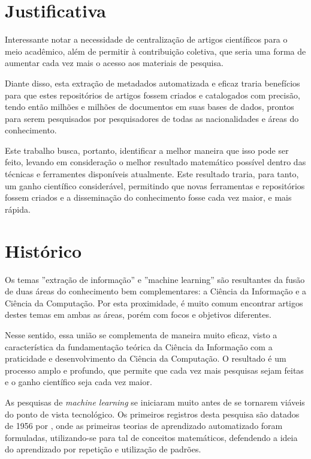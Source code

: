 \section{Justificativa}
\label{sec:justification}

Interessante notar a necessidade de centralização de artigos científicos para o meio acadêmico, além de permitir à contribuição coletiva, que seria uma forma de aumentar cada vez mais o acesso aos materiais de pesquisa. 

Diante disso, esta extração de metadados automatizada e eficaz traria benefícios para que estes repositórios de artigos fossem criados e catalogados com precisão, tendo então milhões e milhões de documentos em suas bases de dados, prontos para serem pesquisados por pesquisadores de todas as nacionalidades e áreas do conhecimento.

Este trabalho busca, portanto, identificar a melhor maneira que isso pode ser feito, levando em consideração o melhor resultado matemático possível dentro das técnicas e ferramentes disponíveis atualmente. Este resultado traria, para tanto, um ganho científico considerável, permitindo que novas ferramentas e repositórios fossem criados e a disseminação do conhecimento fosse cada vez maior, e mais rápida.

\section{Histórico}
\label{sec:history}

Os temas ''extração de informação'' e ''machine learning'' são resultantes da fusão de duas áreas do conhecimento bem complementares: a Ciência da Informação e a Ciência da Computação. Por esta proximidade, é muito comum encontrar artigos destes temas em ambas as áreas, porém com focos e objetivos diferentes.

Nesse sentido, essa união se complementa de maneira muito eficaz, visto a característica da fundamentação teórica da Ciência da Informação com a praticidade e desenvolvimento da Ciência da Computação. O resultado é um processo amplo e profundo, que permite que cada vez mais pesquisas sejam feitas e o ganho científico seja cada vez maior.

As pesquisas de \textit{machine learning} se iniciaram muito antes de se tornarem viáveis do ponto de vista tecnológico. Os primeiros registros desta pesquisa são datados de 1956 por \cite{machine-learning}, onde as primeiras teorias de aprendizado automatizado foram formuladas, utilizando-se para tal de conceitos matemáticos, defendendo a ideia do aprendizado por repetição e utilização de padrões.

